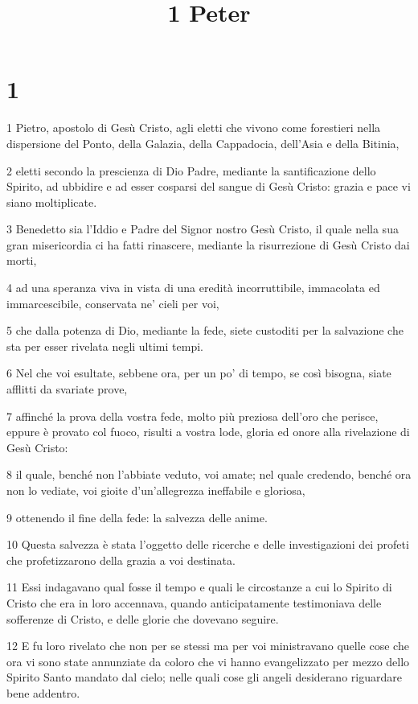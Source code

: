 

\title{1 Peter}


\chapter{1}

\par 1 Pietro, apostolo di Gesù Cristo, agli eletti che vivono come forestieri nella dispersione del Ponto, della Galazia, della Cappadocia, dell'Asia e della Bitinia,
\par 2 eletti secondo la prescienza di Dio Padre, mediante la santificazione dello Spirito, ad ubbidire e ad esser cosparsi del sangue di Gesù Cristo: grazia e pace vi siano moltiplicate.
\par 3 Benedetto sia l'Iddio e Padre del Signor nostro Gesù Cristo, il quale nella sua gran misericordia ci ha fatti rinascere, mediante la risurrezione di Gesù Cristo dai morti,
\par 4 ad una speranza viva in vista di una eredità incorruttibile, immacolata ed immarcescibile, conservata ne' cieli per voi,
\par 5 che dalla potenza di Dio, mediante la fede, siete custoditi per la salvazione che sta per esser rivelata negli ultimi tempi.
\par 6 Nel che voi esultate, sebbene ora, per un po' di tempo, se così bisogna, siate afflitti da svariate prove,
\par 7 affinché la prova della vostra fede, molto più preziosa dell'oro che perisce, eppure è provato col fuoco, risulti a vostra lode, gloria ed onore alla rivelazione di Gesù Cristo:
\par 8 il quale, benché non l'abbiate veduto, voi amate; nel quale credendo, benché ora non lo vediate, voi gioite d'un'allegrezza ineffabile e gloriosa,
\par 9 ottenendo il fine della fede: la salvezza delle anime.
\par 10 Questa salvezza è stata l'oggetto delle ricerche e delle investigazioni dei profeti che profetizzarono della grazia a voi destinata.
\par 11 Essi indagavano qual fosse il tempo e quali le circostanze a cui lo Spirito di Cristo che era in loro accennava, quando anticipatamente testimoniava delle sofferenze di Cristo, e delle glorie che dovevano seguire.
\par 12 E fu loro rivelato che non per se stessi ma per voi ministravano quelle cose che ora vi sono state annunziate da coloro che vi hanno evangelizzato per mezzo dello Spirito Santo mandato dal cielo; nelle quali cose gli angeli desiderano riguardare bene addentro.
